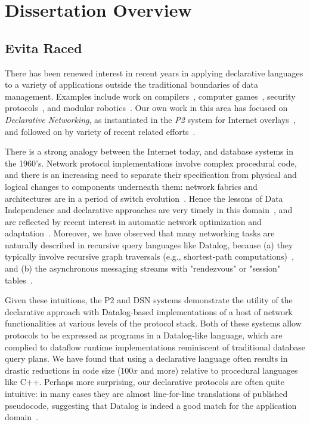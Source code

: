 \chapter[Dissertation Overview]{Dissertation Overview}
\label{ch:overview}

\section{Evita Raced}
There has been renewed interest in recent years in applying declarative
languages to a variety of applications outside the traditional
boundaries of data management.  Examples include work on
compilers~\cite{lam05context}, computer games~\cite{white-sigmod07}, security
protocols~\cite{li-padl03}, and modular
robotics~\cite{ashley-iros07}. Our own work in this area has focused on {\em Declarative Networking},
as instantiated in the {\em P2} system for Internet overlays~\cite{p2:sosp, loo-sigmod06}, and 
followed on by variety of recent related efforts~\cite{singh-eurosys06, chu-sensys07,abadi-netdb07,belaramani-sosp07,soule-sosp07}.

There is a strong analogy between the Internet today, and database systems in the
1960's. Network protocol implementations involve complex procedural code, and
there is an increasing need to separate their specification from physical and logical
changes to components underneath them: network fabrics and architectures are in
a period of switch evolution~\cite{geni05}. Hence the lessons of Data Independence
and declarative approaches are very timely in this domain~\cite{networkind}, and are
reflected by recent interest in automatic network optimization and adaptation~\cite{grace-eurosys08}.
Moreover, we have observed that many networking tasks are naturally described in recursive
query languages like Datalog, because (a) they typically involve recursive graph traversals
(e.g., shortest-path computations)~\cite{loo-sigcomm05}, and (b) the asynchronous messaging
streams with "rendezvous" or "session" tables~\cite{p2:sosp, loo-sigmod06}.

Given these intuitions, the P2 and DSN systems demonstrate the utility of the declarative
approach with Datalog-based implementations of a host of network functionalities at
various levels of the protocol stack. Both of these systems allow protocols to be expressed 
as programs in a Datalog-like language, which are complied to dataflow runtime implementations
reminiscent of traditional database query plans. We have found that using a declarative language
often results in drastic reductions in code size ($100x$ and more) relative to procedural languages
like C++. Perhaps more surprising, our declarative protocols are often quite intuitive: in many 
cases they are almost line-for-line translations of published pseudocode, suggesting that 
Datalog is indeed a good match for the application domain~\cite{chu-sensys07, p2:sosp}.

